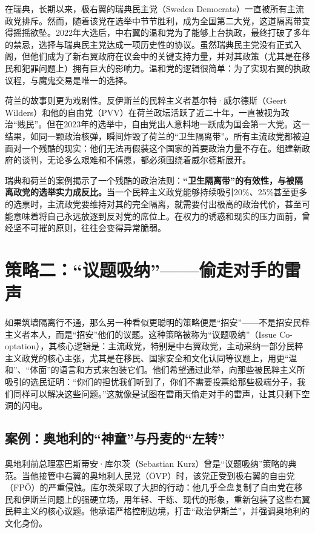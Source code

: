 在瑞典，长期以来，极右翼的瑞典民主党（Sweden Democrats）一直被所有主流政党排斥。然而，随着该党在选举中节节胜利，成为全国第二大党，这道隔离带变得摇摇欲坠。2022年大选后，中右翼的温和党为了能够上台执政，最终打破了多年的禁忌，选择与瑞典民主党达成一项历史性的协议。虽然瑞典民主党没有正式入阁，但他们成为了新右翼政府在议会中的关键支持力量，并对其政策（尤其是在移民和犯罪问题上）拥有巨大的影响力。温和党的逻辑很简单：为了实现右翼的执政议程，与魔鬼交易是唯一的选择。

荷兰的故事则更为戏剧性。反伊斯兰的民粹主义者基尔特·威尔德斯（Geert Wilders）和他的自由党（PVV）在荷兰政坛活跃了近二十年，一直被视为政治“贱民”。但在2023年的选举中，自由党出人意料地一跃成为国会第一大党。这一结果，如同一颗政治核弹，瞬间炸毁了荷兰的“卫生隔离带”。所有主流政党都被迫面对一个残酷的现实：他们无法再假装这个国家的首要政治力量不存在。组建新政府的谈判，无论多么艰难和不情愿，都必须围绕着威尔德斯展开。

瑞典和荷兰的案例揭示了一个残酷的政治法则：\textbf{“卫生隔离带”的有效性，与被隔离政党的选举实力成反比。}当一个民粹主义政党能够持续吸引20\%、25\%甚至更多的选票时，主流政党要维持对其的完全隔离，就需要付出极高的政治代价，甚至可能意味着将自己永远放逐到反对党的席位上。在权力的诱惑和现实的压力面前，曾经坚不可摧的原则，往往会变得异常脆弱。

\section{策略二：“议题吸纳”——偷走对手的雷声}
如果筑墙隔离行不通，那么另一种看似更聪明的策略便是“招安”——不是招安民粹主义者本人，而是“招安”他们的议题。这种策略被称为“议题吸纳”（Issue Co-optation），其核心逻辑是：主流政党，特别是中右翼政党，主动采纳一部分民粹主义政党的核心主张，尤其是在移民、国家安全和文化认同等议题上，用更“温和”、“体面”的语言和方式来包装它们。他们希望通过此举，向那些被民粹主义所吸引的选民证明：“你们的担忧我们听到了，你们不需要投票给那些极端分子，我们同样可以解决这些问题。”这就像是试图在雷雨天偷走对手的雷声，让其只剩下空洞的闪电。

\subsection{案例：奥地利的“神童”与丹麦的“左转”}

奥地利前总理塞巴斯蒂安·库尔茨（Sebastian Kurz）曾是“议题吸纳”策略的典范。当他接管中右翼的奥地利人民党（ÖVP）时，该党正受到极右翼的自由党（FPÖ）的严重侵蚀。库尔茨采取了大胆的行动：他几乎全盘复制了自由党在移民和伊斯兰问题上的强硬立场，用年轻、干练、现代的形象，重新包装了这些右翼民粹主义的核心议题。他承诺严格控制边境，打击“政治伊斯兰”，并强调奥地利的文化身份。


